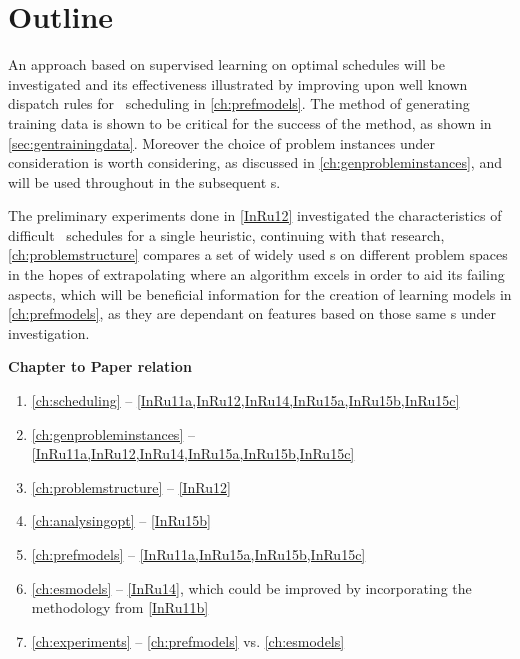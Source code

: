\section{Outline}
An approach based on supervised learning on optimal schedules will be 
investigated and its effectiveness illustrated by improving upon well known 
dispatch rules for \jsp\ scheduling in \cref{ch:prefmodels}. The method of 
generating training data is shown to be critical for the success of the method, 
as shown in \cref{sec:gentrainingdata}. Moreover the choice of problem 
instances under consideration is worth considering, as discussed in 
\cref{ch:genprobleminstances}, and will be used throughout in the subsequent 
s. 

The preliminary experiments done in \cref{InRu12} investigated the 
characteristics of difficult \jsp\ schedules for a single heuristic, continuing 
with that research, \cref{ch:problemstructure} compares a set of widely used 
\dr s on different problem spaces in the hopes of extrapolating 
where an algorithm excels in order to aid its failing aspects, which will be 
beneficial information for the creation of learning models in 
\cref{ch:prefmodels}, as they are dependant  on features based on those same 
\dr s under investigation.

\vfill
\noindent \textbf{Chapter to Paper relation}
\begin{enumerate}
  \item \cref{ch:scheduling} --
  \cref{InRu11a,InRu12,InRu14,InRu15a,InRu15b,InRu15c}
  \item \cref{ch:genprobleminstances} --
  \cref{InRu11a,InRu12,InRu14,InRu15a,InRu15b,InRu15c}
  \item \cref{ch:problemstructure} -- \cref{InRu12}
  \item \cref{ch:analysingopt} -- \cref{InRu15b}
  \item \cref{ch:prefmodels} -- \cref{InRu11a,InRu15a,InRu15b,InRu15c}
  \item \cref{ch:esmodels} -- \cref{InRu14}, which could be improved by 
  incorporating the methodology from \cref{InRu11b}
  \item \cref{ch:experiments} -- \cref{ch:prefmodels} vs. \cref{ch:esmodels}
\end{enumerate}

